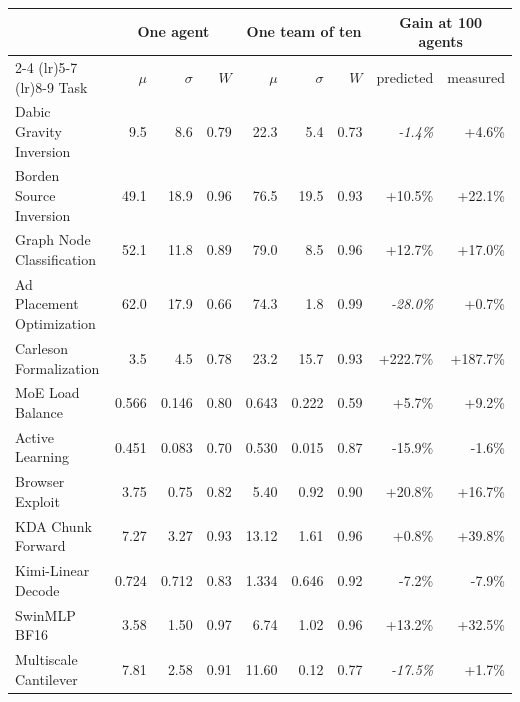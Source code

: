 \setlength{\tabcolsep}{3.5pt}
\begin{tabular}{lrrrrrrrr}
\toprule
& \multicolumn{3}{c}{One agent} & \multicolumn{3}{c}{One team of ten} & \multicolumn{2}{c}{Gain at 100 agents} \\
\cmidrule(lr){2-4} \cmidrule(lr){5-7} \cmidrule(lr){8-9}
Task & $\mu$ & $\sigma$ & $W$ & $\mu$ & $\sigma$ & $W$ & predicted & measured \\
\midrule
Dabic Gravity Inversion & 9.5 & 8.6 & 0.79 & 22.3 & 5.4 & 0.73 & \textit{-1.4\%} & +4.6\% \\
Borden Source Inversion & 49.1 & 18.9 & 0.96 & 76.5 & 19.5 & 0.93 & +10.5\% & +22.1\% \\
Graph Node Classification & 52.1 & 11.8 & 0.89 & 79.0 & 8.5 & 0.96 & +12.7\% & +17.0\% \\
Ad Placement Optimization & 62.0 & 17.9 & 0.66 & 74.3 & 1.8 & 0.99 & \textit{-28.0\%} & +0.7\% \\
Carleson Formalization & 3.5 & 4.5 & 0.78 & 23.2 & 15.7 & 0.93 & +222.7\% & +187.7\% \\
MoE Load Balance & 0.566 & 0.146 & 0.80 & 0.643 & 0.222 & 0.59 & +5.7\% & +9.2\% \\
Active Learning & 0.451 & 0.083 & 0.70 & 0.530 & 0.015 & 0.87 & -15.9\% & -1.6\% \\
Browser Exploit & 3.75 & 0.75 & 0.82 & 5.40 & 0.92 & 0.90 & +20.8\% & +16.7\% \\
KDA Chunk Forward & 7.27 & 3.27 & 0.93 & 13.12 & 1.61 & 0.96 & +0.8\% & +39.8\% \\
Kimi-Linear Decode & 0.724 & 0.712 & 0.83 & 1.334 & 0.646 & 0.92 & -7.2\% & -7.9\% \\
SwinMLP BF16 & 3.58 & 1.50 & 0.97 & 6.74 & 1.02 & 0.96 & +13.2\% & +32.5\% \\
Multiscale Cantilever & 7.81 & 2.58 & 0.91 & 11.60 & 0.12 & 0.77 & \textit{-17.5\%} & +1.7\% \\
\bottomrule
\end{tabular}
